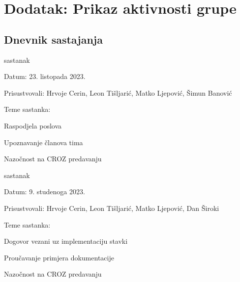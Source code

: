 \chapter*{Dodatak: Prikaz aktivnosti grupe}
		
		\section*{Dnevnik sastajanja}
		
		\begin{packed_enum}
			\item  sastanak
			
			\item[] \begin{packed_item}
				\item Datum: 23. listopada 2023.
				\item Prisustvovali: Hrvoje Cerin, Leon Tišljarić, Matko Ljepović,  Šimun Banović
				\item Teme sastanka:
				\begin{packed_item}
					\item  Raspodjela poslova
					\item  Upoznavanje članova tima
					\item  Nazočnost na CROZ predavanju
				\end{packed_item}
			\end{packed_item}
			
			\item  sastanak
			\item[] \begin{packed_item}
				\item Datum: 9. studenoga 2023.
				\item Prisustvovali: Hrvoje Cerin, Leon Tišljarić, Matko Ljepović,  Dan Široki
				\item Teme sastanka:
				\begin{packed_item}
					\item  Dogovor vezani uz implementaciju stavki
					\item  Proučavanje primjera dokumentacije
					\item  Nazočnost na CROZ predavanju
				\end{packed_item}
			\end{packed_item}
			
			
		\end{packed_enum}
		
